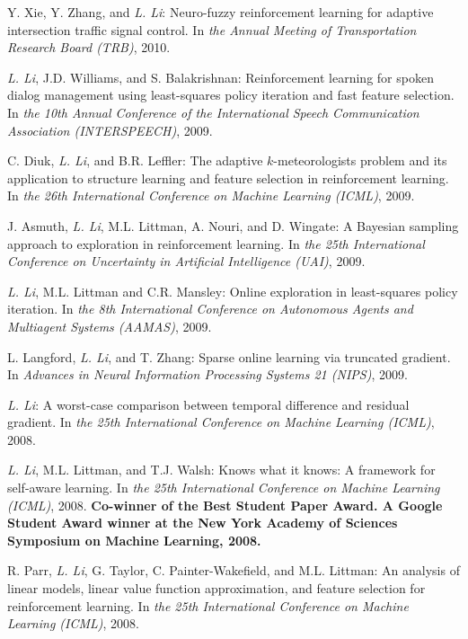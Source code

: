 \documentclass[10pt,twoside,letterpaper]{article}
\newcommand{\selffont}[1]{{\textit{#1}}}
\newcommand{\venuefont}[1]{{\textit{#1}}}
\newcommand{\myself}{\selffont{L. Li}}
\begin{document}
\begin{compactenum}[(C1)]
\item{Y. Xie, Y. Zhang, and \myself: Neuro-fuzzy reinforcement learning for adaptive intersection traffic signal control.  In \venuefont{the Annual Meeting of Transportation Research Board (TRB)}, 2010.}

\item{\myself, J.D. Williams, and S. Balakrishnan:
Reinforcement learning for spoken dialog management using
least-squares policy iteration and fast feature selection. In
\venuefont{the 10th Annual Conference of the International Speech
Communication Association (INTERSPEECH)}, 2009.}

\item{C. Diuk, \myself, and B.R. Leffler: The adaptive
$k$-meteorologists problem and its application to structure
learning and feature selection in reinforcement learning. In
\venuefont{the 26th International Conference on Machine
Learning (ICML)}, 2009.}

\item{J. Asmuth, \myself, M.L. Littman, A. Nouri, and D.
Wingate: A Bayesian sampling approach to exploration in
reinforcement learning.  In \venuefont{the 25th
International Conference on Uncertainty in Artificial Intelligence
(UAI)}, 2009.}

\item{\myself, M.L. Littman and C.R. Mansley: Online
exploration in least-squares policy iteration. In \venuefont{the
8th International Conference on Autonomous Agents and
Multiagent Systems (AAMAS)}, 2009}.

\item{L. Langford, \myself, and T. Zhang: Sparse online
learning via truncated gradient.  In \venuefont{Advances in Neural
Information Processing Systems 21 (NIPS)}, 2009.}

\item{\myself: A worst-case comparison between temporal
difference and residual gradient.  In \venuefont{the 25th
International Conference on Machine Learning (ICML)}, 2008.}

\item{\myself, M.L. Littman, and T.J. Walsh: Knows what it
knows: A framework for self-aware learning. In \venuefont{the
25th International Conference on Machine Learning (ICML)},
2008.  \textbf{Co-winner of the Best Student Paper Award.
A Google Student Award winner at the New York Academy of Sciences
Symposium on Machine Learning, 2008.}}

\item{R. Parr, \myself, G. Taylor, C. Painter-Wakefield, and
M.L. Littman: An analysis of linear models, linear value function
approximation, and feature selection for reinforcement learning.
In \venuefont{the 25th International Conference on Machine
Learning (ICML)}, 2008.}


\end{compactenum}
\end{document}
